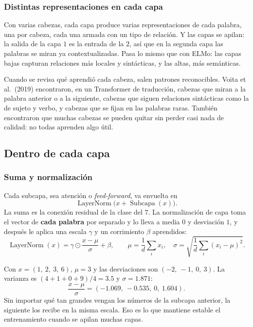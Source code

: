 \documentclass[11pt,letterpaper]{article}
\begin{document}
\subsubsection*{Distintas representaciones en cada capa}

Con varias cabezas, cada capa produce varias representaciones de cada
palabra, una por cabeza, cada una armada con un tipo de relación. Y
las capas se apilan: la salida de la capa $1$ es la entrada de la $2$,
así que en la segunda capa las palabras se miran ya contextualizadas.
Pasa lo mismo que con ELMo: las capas bajas capturan relaciones más
locales y sintácticas, y las altas, más semánticas.

\begin{observacion}
    Cuando se revisa qué aprendió cada cabeza, salen patrones
    reconocibles. Voita et al.\ (2019) encontraron, en un Transformer
    de traducción, cabezas que miran a la palabra anterior o a la
    siguiente, cabezas que siguen relaciones sintácticas como la de
    sujeto y verbo, y cabezas que se fijan en las palabras raras.
    También encontraron que muchas cabezas se pueden quitar sin perder
    casi nada de calidad: no todas aprenden algo útil.
\end{observacion}


\subsection*{Dentro de cada capa}

\subsubsection*{Suma y normalización}

Cada subcapa, sea atención o \textit{feed-forward}, va envuelta en
\[
    \operatorname{LayerNorm}\big(x + \operatorname{Subcapa}(x)\big) .
\]
La suma es la conexión residual de la clase del $7$. La normalización
de capa toma el vector de \textbf{cada palabra} por separado y lo
lleva a media $0$ y desviación $1$, y después le aplica una escala
$\gamma$ y un corrimiento $\beta$ aprendidos:
\[
    \operatorname{LayerNorm}(x) = \gamma \odot \frac{x - \mu}{\sigma}
                                  + \beta ,
    \qquad
    \mu = \frac{1}{d} \sum_i x_i ,
    \quad
    \sigma = \sqrt{\frac{1}{d} \sum_i (x_i - \mu)^2} .
\]

\begin{ejemplo}
    Con $x = (1,\ 2,\ 3,\ 6)$, $\mu = 3$ y las desviaciones son
    $(-2,\ -1,\ 0,\ 3)$. La varianza es $(4 + 1 + 0 + 9)/4 = 3.5$ y
    $\sigma = 1.871$:
    \[
        \frac{x - \mu}{\sigma} = (-1.069,\ -0.535,\ 0,\ 1.604) .
    \]
    Sin importar qué tan grandes vengan los números de la subcapa
    anterior, la siguiente los recibe en la misma escala. Eso es lo
    que mantiene estable el entrenamiento cuando se apilan muchas
    capas.
\end{ejemplo}
\end{document}
